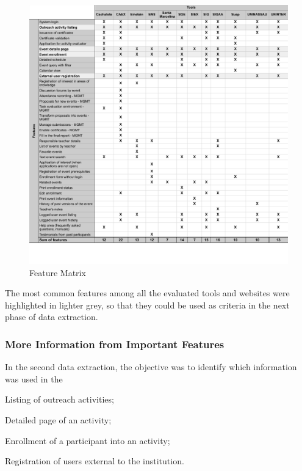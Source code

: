 \begin{figure}[!htb]
  \caption{Feature Matrix}\label{fig:gl-matrix}
  \begin{center}
    \includegraphics[width=16cm]{img/4-functionality-matrix.pdf}
  \end{center}
\end{figure}

The most common features among all the evaluated tools and websites were highlighted in lighter grey, so that they could be used as criteria in the next phase of data extraction.

\subsubsection{More Information from Important Features}\label{sec:gl-data-extraction-2}

In the second data extraction, the objective was to identify which information was used in the
\begin{inparaenum}[(i)]
  \item Listing of outreach activities;
  \item Detailed page of an activity;
  \item Enrollment of a participant into an activity;
  \item Registration of users external to the institution.
\end{inparaenum}

